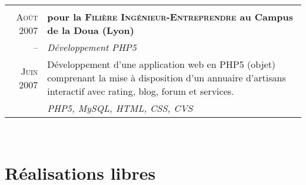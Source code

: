 \documentclass[a4paper,10pt]{article}
\begin{document}
\begin{supertabular}{r|p{11cm}}
   \\
  \textsc{Août} 2007 & \textbf{pour la \textsc{Filière Ingénieur-Entreprendre} au Campus de la Doua (Lyon)} \\
  -- & \emph{Développement PHP5} \\
  \footnotesize{\textsc{Juin} 2007} & \footnotesize{Développement d’une application web en PHP5 (objet) comprenant la mise à disposition d’un annuaire d’artisans interactif avec rating, blog, forum et services.} \\
  & \emph{PHP5, MySQL, HTML, CSS, CVS} \\

\end{supertabular} \\

\section{Réalisations libres}
\end{document}
